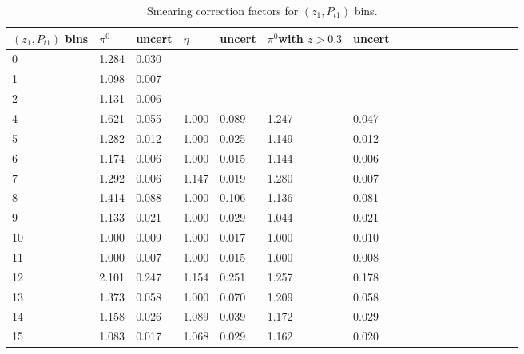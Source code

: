 \begin{table}[H]\footnotesize
\centering
\begin{tabular}{|l|l|l|l|l|l|l|l|l|l|l|l|l|l|l|l|l|l|}
\\ \hline
$(z_{1},P_{t1})$ bins & $\pi^0$ &  uncert& $\eta$  &uncert  & $\pi^0$\scriptsize{with $z>0.3$} & uncert \\ \hline
0	&	1.284 &0.030 \\ \hline
1&1.098 &0.007 & & 	& & \\ \hline
2& 1.131&0.006 & & 	& & \\ \hline
4&1.621&0.055& 1.000 	&0.089 &1.247 	&0.047\\ \hline
5&1.282 &0.012 &1.000	 &0.025 	&1.149	 &0.012 \\ \hline
6&1.174&0.006 &1.000	 &0.015 	&1.144	 &0.006 \\ \hline
7&1.292 & 0.006 &1.147 	 &0.019 	&1.280 	&0.007 \\ \hline
8&1.414 & 0.088 &1.000	 &0.106 	&1.136 	&0.081 \\ \hline
9&1.133 &0.021 &1.000	 &0.029 	&1.044 	&0.021\\ \hline
10&1.000 &0.009 &1.000	 &0.017 	&1.000 	&0.010\\ \hline
11&1.000 &0.007 &1.000	 &0.015 	&1.000 	&0.008\\ \hline
12&2.101&0.247 &1.154	 &0.251 	&1.257 	&0.178\\ \hline
13&1.373&0.058 &1.000	 &0.070 	&1.209 	&0.058\\ \hline
14&1.158&0.026 &1.089	 &0.039 	&1.172 	&0.029\\ \hline
15&1.083&0.017&1.068	 &0.029 	&1.162 	&0.020\\ \hline
\end{tabular}
\caption{Smearing correction factors for $(z_1,P_{t1})$ bins.}
\label{tab:zpt_smearing_info}
\end{table}

